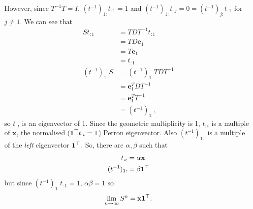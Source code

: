\begin{solution}
	However, since $T^{-1}T = I$, $(t^{-1})_{1:}t_{:1} = 1$ and $(t^{-1})_{1:}t_{:j} = 0 = (t^{-1})_{j:}t_{:1}$ for $j \neq 1$.
	We can see that
	\begin{align*}
	St_{:1}
	& = TDT^{-1}t_{:1}\\
	& = TD\mathbf{e}_1\\
	& = T\mathbf{e}_1\\
	& = t_{:1}\\
	(t^{-1})_{1:}S
	& = (t^{-1})_{1:}TDT^{-1}\\
	& = \mathbf{e}_1^TDT^{-1}\\
	& = \mathbf{e}_1^TT^{-1}\\
	& = (t^{-1})_{1:},
	\end{align*}
	so $t_{:i}$ is an eigenvector of 1.
	Since the geometric multiplicity is 1, $t_{:i}$ is a multiple of $\mathbf{x}$,
	the normalised ($\mathbf{1}^\top t_{:i} = 1$) Perron eigenvector.
	Also $(t^{-1})_{1:}$ is a multiple of the \emph{left} eigenvector $\mathbf{1}^\top$.
	So, there are $\alpha,\beta$ such that
	\begin{align*}
	t_{:i} & = \alpha \mathbf{x}\\
	(t^{-1})_{1:} & = \beta \mathbf{1}^\top
	\end{align*}
	but since $(t^{-1})_{1:}t_{:1} = 1$, $\alpha\beta = 1$ so
	\[ \lim_{n \to \infty} S^n = \mathbf{x}\mathbf{1}^\top. \]
\end{solution}
